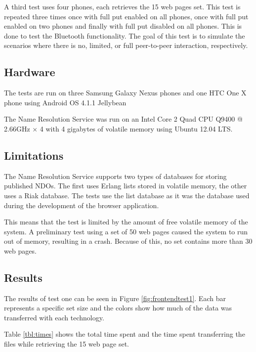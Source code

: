 A third test uses four phones, each retrieves the 15 web pages set. 
This test is repeated three times once with full put enabled on all phones, once with full put enabled 
on two phones and finally with full put disabled on all phones. 
This is done to test the Bluetooth functionality. 
The goal of this test is to simulate the scenarios where there is no, limited, or full peer-to-peer interaction, respectively.

\subsection{Hardware}

The tests are run on three Samsung Galaxy Nexus phones and one 
HTC One X phone using Android OS 4.1.1 Jellybean

The Name Resolution Service was run on an 
Intel Core 2 Quad CPU Q9400 @ 2.66GHz × 4 with 4 gigabytes 
of volatile memory using Ubuntu 12.04 LTS.

\subsection{Limitations}

The Name Resolution Service supports two types of databases for storing published NDOs. The first uses Erlang 
lists stored in volatile memory, the other uses a Riak database. 
The tests use the list database as it was the database used during the development of the browser application.

This means that the test is limited by the amount of free 
volatile memory of the system. A preliminary test using a set of 50 web 
pages caused the system to run out of memory, resulting in a crash. 
Because of this, no set contains more than 30 web pages.

\subsection{Results}




The results of test one can be seen in Figure \ref{fig:frontendtest1}. Each bar represents a 
specific set size and the colors show how much of the data was transferred with each technology.

Table \ref{tbl:times} shows the total time spent and the time spent transferring the files while retrieving 
the 15 web page set.

